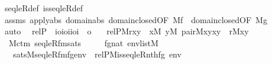 \begin{isabellebody}
\ seqleR{\isacharunderscore}{\kern0pt}def\ is{\isacharunderscore}{\kern0pt}seqleR{\isacharunderscore}{\kern0pt}def\ \isanewline
\ \ \isamarkupfalse%
\ assms\ apply{\isacharunderscore}{\kern0pt}abs\ domain{\isacharunderscore}{\kern0pt}abs\ domain{\isacharunderscore}{\kern0pt}closed{\isacharbrackleft}{\kern0pt}OF\ {\isacartoucheopen}M{\isacharparenleft}{\kern0pt}f{\isacharparenright}{\kern0pt}{\isacartoucheclose}{\isacharbrackright}{\kern0pt}\ \ domain{\isacharunderscore}{\kern0pt}closed{\isacharbrackleft}{\kern0pt}OF\ {\isacartoucheopen}M{\isacharparenleft}{\kern0pt}g{\isacharparenright}{\kern0pt}{\isacartoucheclose}{\isacharbrackright}{\kern0pt}\isanewline
\ \ \isamarkupfalse%
\ auto%
\endisatagproof
{\isafoldproof}%
%
\isadelimproof
\isanewline
%
\endisadelimproof
\isanewline
{}\isamarkupfalse%
\isanewline
\ \ relP\ {\isacharcolon}{\kern0pt}{\isacharcolon}{\kern0pt}\ {\isachardoublequoteopen}{\isacharbrackleft}{\kern0pt}i{\isasymRightarrow}o{\isacharcomma}{\kern0pt}{\isacharbrackleft}{\kern0pt}i{\isasymRightarrow}o{\isacharcomma}{\kern0pt}i{\isacharcomma}{\kern0pt}i{\isacharbrackright}{\kern0pt}{\isasymRightarrow}o{\isacharcomma}{\kern0pt}i{\isacharbrackright}{\kern0pt}\ {\isasymRightarrow}\ o{\isachardoublequoteclose}\ \isanewline
\ \ {\isachardoublequoteopen}relP{\isacharparenleft}{\kern0pt}M{\isacharcomma}{\kern0pt}r{\isacharcomma}{\kern0pt}xy{\isacharparenright}{\kern0pt}\ {\isasymequiv}\ {\isacharparenleft}{\kern0pt}{\isasymexists}x{\isacharbrackleft}{\kern0pt}M{\isacharbrackright}{\kern0pt}{\isachardot}{\kern0pt}\ {\isasymexists}y{\isacharbrackleft}{\kern0pt}M{\isacharbrackright}{\kern0pt}{\isachardot}{\kern0pt}\ pair{\isacharparenleft}{\kern0pt}M{\isacharcomma}{\kern0pt}x{\isacharcomma}{\kern0pt}y{\isacharcomma}{\kern0pt}xy{\isacharparenright}{\kern0pt}\ {\isasymand}\ r{\isacharparenleft}{\kern0pt}M{\isacharcomma}{\kern0pt}x{\isacharcomma}{\kern0pt}y{\isacharparenright}{\kern0pt}{\isacharparenright}{\kern0pt}{\isachardoublequoteclose}\isanewline
\isanewline
{}\isamarkupfalse%
\ {\isacharparenleft}{\kern0pt}\ M{\isacharunderscore}{\kern0pt}ctm{\isacharparenright}{\kern0pt}\ seqleR{\isacharunderscore}{\kern0pt}fm{\isacharunderscore}{\kern0pt}sats\ {\isacharcolon}{\kern0pt}\ \isanewline
\ \ \ {\isachardoublequoteopen}fg{\isasymin}nat{\isachardoublequoteclose}\ {\isachardoublequoteopen}env{\isasymin}list{\isacharparenleft}{\kern0pt}M{\isacharparenright}{\kern0pt}{\isachardoublequoteclose}\ \isanewline
\ \ \ {\isachardoublequoteopen}sats{\isacharparenleft}{\kern0pt}M{\isacharcomma}{\kern0pt}seqleR{\isacharunderscore}{\kern0pt}fm{\isacharparenleft}{\kern0pt}fg{\isacharparenright}{\kern0pt}{\isacharcomma}{\kern0pt}env{\isacharparenright}{\kern0pt}\ {\isasymlongleftrightarrow}\ relP{\isacharparenleft}{\kern0pt}{\isacharhash}{\kern0pt}{\isacharhash}{\kern0pt}M{\isacharcomma}{\kern0pt}is{\isacharunderscore}{\kern0pt}seqleR{\isacharcomma}{\kern0pt}nth{\isacharparenleft}{\kern0pt}fg{\isacharcomma}{\kern0pt}\ env{\isacharparenright}{\kern0pt}{\isacharparenright}{\kern0pt}{\isachardoublequoteclose}\isanewline

\end{isabellebody}
